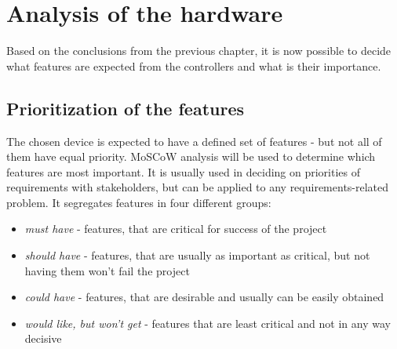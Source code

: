 \chapter{Analysis of the hardware}
Based on the conclusions from the previous chapter, it is now possible to decide what features are expected from the controllers and what is their importance.

\section{Prioritization of the features}
The chosen device is expected to have a defined set of features - but not all of them have equal priority. MoSCoW analysis will be used to determine which features are most important\cite{moscow}. It is usually used in deciding on priorities of requirements with stakeholders, but can be applied to any requirements-related problem. It segregates features in four different groups: \begin{itemize}
\item \emph{must have} - features, that are critical for success of the project
\item \emph{should have} - features, that are usually as important as critical, but not having them won't fail the project
\item \emph{could have} - features, that are desirable and usually can be easily obtained 
\item \emph{would like, but won't get} - features that are least critical and not in any way decisive 
\end{itemize}

